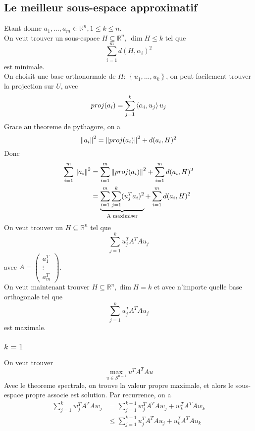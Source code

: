 \documentclass[../main.tex]{subfiles}
\begin{document}
\subsection{Le meilleur sous-espace approximatif}
Etant donne $a_1, \ldots, a_m\in \mathbb{R}^{n}, 1 \leq  k \leq n$.\\
On veut trouver un sous-espace $H \subseteq \mathbb{R}^n$, $\dim  H \leq k$ tel que
\[ 
	\sum_{i=1}^{ m}d ( H,\alpha_i) ^{2}
\]
est minimale.\\
On choisit une base orthonormale de $H$: $ \left\{ u_1, \ldots, u_k \right\} $, on peut facilement trouver la projection sur $U$, avec
\[ 
	proj( a_i) = \sum_{j=1}^{ k} \left\langle \alpha_i,u_j\right\rangle  u_j
\]
Grace au theoreme de pythagore, on a
\[ 
	\left\lVert a_i\right\rVert ^{2} = \left\lVert proj( a_i) \right\rVert ^{2}+ d ( a_i,H) ^{2}
\]
Donc
\begin{align*}
	\sum_{i=1}^{ m}\left\lVert a_i\right\rVert ^{2} &= \sum_{i=1}^{ m}\left\lVert proj( a_i) \right\rVert ^{2} + \sum_{i=1}^{ m} d ( a_i,H) ^{2}\\
				      &= \underbrace{\sum_{i=1}^{ m} \sum_{j=1}^{ k} ( u_j^{T}a_i) ^{2}}_{ \text{ A maximiser } } + \sum_{i=1}^{ m}d ( a_i,H) ^{2}
\end{align*}
On veut trouver un $H \subseteq \mathbb{R}^n$ tel que
\[ 
\sum_{j=1}^{ k} u_j^{T}A^{T}A u_j
\]
avec $A = \begin{pmatrix}
a_1^{T}\\ \vdots \\ a_m^{T}
\end{pmatrix} $.\\
On veut maintenant trouver $H \subseteq \mathbb{R}^n, \dim H = k$ et avec n'importe quelle base orthogonale tel que
\[ 
\sum_{j=1}^{ k} u_j^{T} A^{T} A u_j
\]
est maximale.\\
\subsubsection{$k=1$}
On veut trouver 
\[ 
\max_{u \in S^{n-1} } u^{T}A^{T}A u
\]
Avec le theoreme spectrale, on trouve la valeur propre maximale, et alors le sous-espace propre associe est solution.
Par recurrence, on a
\begin{align*}
\sum_{j=1}^{ k} w_j^{T} A^{T}A w_j &= \sum_{j=1}^{ k-1} w_j ^{T}A^{T}Aw_j + w_k ^{T}A^{T}A w_k\\
				   &\leq  \sum_{j=1}^{ k-1}u_j^{T}A^{T} A u_j + u_k ^{T} A^{T} A u_k
\end{align*}
\end{document}
